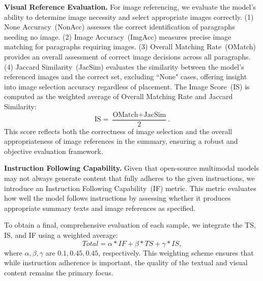 \textbf{Visual Reference Evaluation.} For image referencing, we evaluate the model's ability to determine image necessity and select appropriate images correctly. 
(1) None Accuracy~(NonAcc) assesses the correct identification of paragraphs needing no image. 
(2) Image Accuracy~(ImgAcc) measures precise image matching for paragraphs requiring images. 
(3) Overall Matching Rate~(OMatch) provides an overall assessment of correct image decisions across all paragraphs. 
(4) Jaccard Similarity~(JacSim) evaluates the similarity between the model's referenced images and the correct set, excluding ``None" cases, offering insight into image selection accuracy regardless of placement. 
The Image Score~(IS) is computed as the weighted average of Overall Matching Rate and Jaccard Similarity:
\begin{equation}
\text{IS} = \frac{\text{OMatch} + \text{JacSim}}{2}.
\end{equation}
This score reflects both the correctness of image selection and the overall appropriateness of image references in the summary, ensuring a robust and objective evaluation framework.

\textbf{Instruction Following Capability.} Given that open-source multimodal models may not always generate content that fully adheres to the given instructions, we introduce an Instruction Following Capability~(IF) metric. 
This metric evaluates how well the model follows instructions by assessing whether it produces appropriate summary texts and image references as specified.

To obtain a final, comprehensive evaluation of each sample, we integrate the TS, IS, and IF using a weighted average:
\begin{equation}
    Total = \alpha * IF + \beta * TS + \gamma * IS,
\end{equation}
where $\alpha, \beta, \gamma$ are $0.1, 0.45, 0.45$, respectively. This weighting scheme ensures that while instruction adherence is important, the quality of the textual and visual content remains the primary focus.
